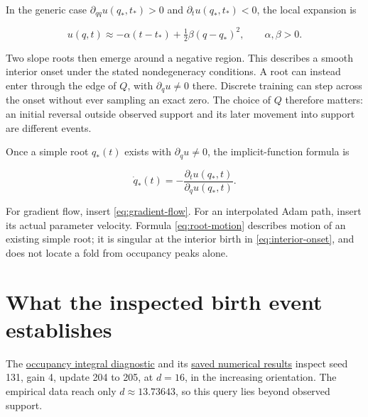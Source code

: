 \documentclass[11pt]{article}
\begin{document}
In the generic case \(\partial_{qq}u(q_*,t_*)>0\) and
\(\partial_tu(q_*,t_*)<0\), the local expansion is

\begin{equation}\label{eq:onset-expansion}
u(q,t)\approx-\alpha(t-t_*)+\tfrac12\beta(q-q_*)^2,
\qquad \alpha,\beta>0.
\end{equation}

Two slope roots then emerge around a negative region. This describes a
smooth interior onset under the stated nondegeneracy conditions. A root
can instead enter through the edge of \(Q\), with \(\partial_qu\ne0\)
there. Discrete training can step across the onset without ever sampling
an exact zero. The choice of \(Q\) therefore matters: an initial
reversal outside observed support and its later movement into support
are different events.

Once a simple root \(q_*(t)\) exists with \(\partial_qu\ne0\), the
implicit-function formula is

\begin{equation}\label{eq:root-motion}
\dot q_*(t)=-\frac{\partial_tu(q_*,t)}{\partial_qu(q_*,t)}.
\end{equation}

For gradient flow, insert \eqref{eq:gradient-flow}. For an interpolated Adam path, insert its
actual parameter velocity. Formula \eqref{eq:root-motion} describes motion of an existing
simple root; it is singular at the interior birth in \eqref{eq:interior-onset}, and does not
locate a fold from occupancy peaks alone.

\section{What the inspected birth event
establishes}\label{what-the-inspected-birth-event-establishes}

The \href{https://github.com/c-tustin/JEPA-Identifiability-Predictive-Subspaces/blob/main/icm-folding/occupancy-integral/README.md}{occupancy integral
diagnostic} and its
\href{https://github.com/c-tustin/JEPA-Identifiability-Predictive-Subspaces/blob/main/icm-folding/occupancy-integral/output/results.json}{saved numerical
results} inspect seed 131, gain 4, update 204 to 205, at \(d=16\), in
the increasing orientation. The empirical data reach only
\(d\approx13.73643\), so this query lies beyond observed support.
\end{document}
